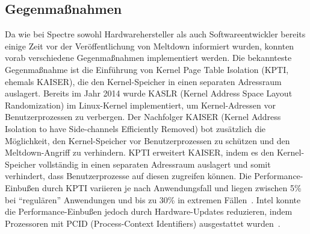 \subsection{Gegenmaßnahmen}
\label{subsec:meltdown_gegenmassnahmen}
Da wie bei Spectre sowohl Hardwarehersteller als auch Softwareentwickler bereits einige Zeit vor der Veröffentlichung von Meltdown informiert wurden, konnten vorab verschiedene Gegenmaßnahmen implementiert werden.
Die bekannteste Gegenmaßnahme ist die Einführung von Kernel Page Table Isolation (KPTI, ehemals KAISER), die den Kernel-Speicher in einen separaten Adressraum auslagert.
Bereits im Jahr 2014 wurde KASLR (Kernel Address Space Layout Randomization) im Linux-Kernel implementiert, um Kernel-Adressen vor Benutzerprozessen zu verbergen.
Der Nachfolger KAISER (Kernel Address Isolation to have Side-channels Efficiently Removed) bot zusätzlich die Möglichkeit, den Kernel-Speicher vor Benutzerprozessen zu schützen und den Meltdown-Angriff zu verhindern.
KPTI erweitert KAISER, indem es den Kernel-Speicher vollständig in einen separaten Adressraum auslagert und somit verhindert, dass Benutzerprozesse auf diesen zugreifen können.
Die Performance-Einbußen durch KPTI variieren je nach Anwendungsfall und liegen zwischen 5\% bei \enquote{regulären} Anwendungen und bis zu 30\% in extremen Fällen~\cite{kaiser_2017}.
Intel konnte die Performance-Einbußen jedoch durch Hardware-Updates reduzieren, indem Prozessoren mit PCID (Process-Context Identifiers) ausgestattet wurden~\cite{pcworld_2018}.